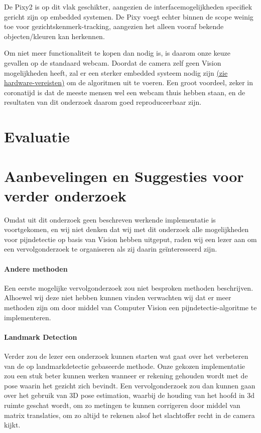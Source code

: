 \documentclass[11pt]{article}
\begin{document}

    De Pixy2 is op dit vlak geschikter, aangezien de interfacemogelijkheden specifiek gericht zijn op embedded systemen.
    De Pixy voegt echter binnen de scope weinig toe voor gezichtskenmerk-tracking, aangezien het alleen vooraf bekende objecten/kleuren kan herkennen.

    Om niet meer functionaliteit te kopen dan nodig is, is daarom onze keuze gevallen op de standaard webcam.
    Doordat de camera zelf geen Vision mogelijkheden heeft, zal er een sterker embedded systeem nodig zijn \hyperref[meth1-hardware]{(zie hardware-vereisten)} om de algoritmen uit te voeren.
    Een groot voordeel, zeker in coronatijd is dat de meeste mensen wel een webcam thuis hebben staan, en de resultaten van dit onderzoek daarom goed reproduceerbaar zijn.


    \section{Evaluatie}\label{sec:evaluatie2}






    \section{Aanbevelingen en Suggesties voor verder onderzoek}\label{sec:aanbevelingen2}
    Omdat uit dit onderzoek geen beschreven werkende implementatie is voortgekomen, en wij niet denken dat wij met dit onderzoek alle
    mogelijkheden voor pijndetectie op basis van Vision hebben uitgeput, raden wij een lezer
    aan om een vervolgonderzoek te organiseren als zij daarin geïnteresseerd zijn.

    \paragraph{Andere methoden} Een eerste mogelijke vervolgonderzoek zou niet besproken methoden beschrijven. Alhoewel wij deze niet hebben kunnen
    vinden verwachten wij dat er meer methoden zijn om door middel van Computer Vision een pijndetectie-algoritme te implementeren.

    \paragraph{Landmark Detection} Verder zou de lezer een onderzoek kunnen starten wat
    gaat over het verbeteren van de op landmarkdetectie gebaseerde methode. Onze gekozen implementatie zou
    een stuk beter kunnen werken wanneer er rekening gehouden wordt met de pose waarin het gezicht zich bevindt.
    Een vervolgonderzoek zou dan kunnen gaan over het gebruik van 3D pose estimation, waarbij de houding van het hoofd
    in 3d ruimte geschat wordt, om zo metingen te kunnen corrigeren door middel van matrix translaties, om zo altijd te
    rekenen alsof het slachtoffer recht in de camera kijkt.
\end{document}
